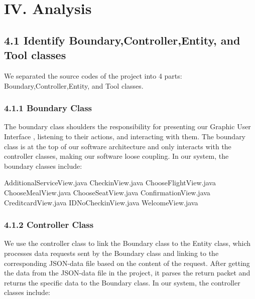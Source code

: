 \documentclass[
]{article}
\author{}
\date{}
\newenvironment{Shaded}{}{}
\newcommand{\NormalTok}[1]{#1}
\begin{document}
\hypertarget{iv-analysis}{%
\section{IV. Analysis}\label{iv-analysis}}

\hypertarget{41-identify-boundarycontrollerentity-and-tool-classes}{%
\subsection{4.1 Identify Boundary,Controller,Entity, and Tool
classes}\label{41-identify-boundarycontrollerentity-and-tool-classes}}

We separated the source codes of the project into 4 parts:
Boundary,Controller,Entity, and Tool classes.

\hypertarget{411-boundary-class}{%
\subsubsection{4.1.1 Boundary Class}\label{411-boundary-class}}

The boundary class shoulders the responsibility for presenting our
Graphic User Interface , listening to their actions, and interacting
with them. The boundary class is at the top of our software architecture
and only interacts with the controller classes, making our software
loose coupling. In our system, the boundary classes include:

\begin{Shaded}
\begin{Highlighting}[]
\NormalTok{ AdditionalServiceView.java}
\NormalTok{ CheckinView.java}
\NormalTok{ ChooseFlightView.java}
\NormalTok{ ChooseMealView.java}
\NormalTok{ ChooseSeatView.java}
\NormalTok{ ConfirmationView.java}
\NormalTok{ CreditcardView.java}
\NormalTok{ IDNoCheckinView.java}
\NormalTok{ WelcomeView.java}
\end{Highlighting}
\end{Shaded}

\hypertarget{412-controller-class}{%
\subsubsection{4.1.2 Controller Class}\label{412-controller-class}}

We use the controller class to link the Boundary class to the Entity
class, which processes data requests sent by the Boundary class and
linking to the corresponding JSON-data file based on the content of the
request. After getting the data from the JSON-data file in the project,
it parses the return packet and returns the specific data to the
Boundary class. In our system, the controller classes include:
\end{document}
